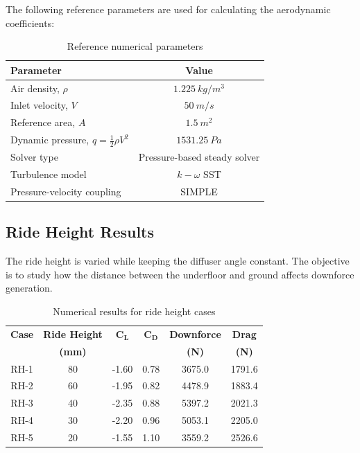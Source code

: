\documentclass[12pt,a4paper]{article}
\begin{document}
The following reference parameters are used for calculating the aerodynamic coefficients:

\begin{table}[H]
\centering
\caption{Reference numerical parameters}
\begin{tabular}{lc}
\toprule
\textbf{Parameter} & \textbf{Value} \\
\midrule
Air density, \(\rho\) & \(1.225~\si{kg/m^3}\) \\
Inlet velocity, \(V\) & \(50~\si{m/s}\) \\
Reference area, \(A\) & \(1.5~\si{m^2}\) \\
Dynamic pressure, \(q=\frac{1}{2}\rho V^2\) & \(1531.25~\si{Pa}\) \\
Solver type & Pressure-based steady solver \\
Turbulence model & \(k-\omega\) SST \\
Pressure-velocity coupling & SIMPLE \\
\bottomrule
\end{tabular}
\end{table}

\subsection{Ride Height Results}

The ride height is varied while keeping the diffuser angle constant. The objective is to study how the distance between the underfloor and ground affects downforce generation.

\begin{table}[H]
\centering
\caption{Numerical results for ride height cases}
\begin{tabular}{cccccc}
\toprule
\textbf{Case} & \textbf{Ride Height} & \(\bm{C_L}\) & \(\bm{C_D}\) & \textbf{Downforce} & \textbf{Drag} \\
 & \textbf{(mm)} & & & \textbf{(N)} & \textbf{(N)} \\
\midrule
RH-1 & 80 & -1.60 & 0.78 & 3675.0 & 1791.6 \\
RH-2 & 60 & -1.95 & 0.82 & 4478.9 & 1883.4 \\
RH-3 & 40 & -2.35 & 0.88 & 5397.2 & 2021.3 \\
RH-4 & 30 & -2.20 & 0.96 & 5053.1 & 2205.0 \\
RH-5 & 20 & -1.55 & 1.10 & 3559.2 & 2526.6 \\
\bottomrule
\end{tabular}
\end{table}
\end{document}
